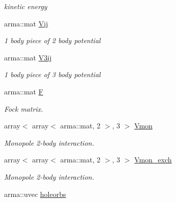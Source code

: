 \begin{DoxyCompactItemize}
\begin{DoxyCompactList}\small\item\em kinetic energy \end{DoxyCompactList}\item 
arma\+::mat \hyperlink{classHartreeFock_ae823da58505b21231d092b3ef7cec3bf}{Vij}\hypertarget{classHartreeFock_ae823da58505b21231d092b3ef7cec3bf}{}\label{classHartreeFock_ae823da58505b21231d092b3ef7cec3bf}

\begin{DoxyCompactList}\small\item\em 1 body piece of 2 body potential \end{DoxyCompactList}\item 
arma\+::mat \hyperlink{classHartreeFock_a25a0f38a655064375765f74182ce9334}{V3ij}\hypertarget{classHartreeFock_a25a0f38a655064375765f74182ce9334}{}\label{classHartreeFock_a25a0f38a655064375765f74182ce9334}

\begin{DoxyCompactList}\small\item\em 1 body piece of 3 body potential \end{DoxyCompactList}\item 
arma\+::mat \hyperlink{classHartreeFock_a45136295f4834a9f692f262eee75672a}{F}\hypertarget{classHartreeFock_a45136295f4834a9f692f262eee75672a}{}\label{classHartreeFock_a45136295f4834a9f692f262eee75672a}

\begin{DoxyCompactList}\small\item\em Fock matrix. \end{DoxyCompactList}\item 
array$<$ array$<$ arma\+::mat, 2 $>$, 3 $>$ \hyperlink{classHartreeFock_a2824bb161e6889684e0f54e5bc11e37e}{Vmon}\hypertarget{classHartreeFock_a2824bb161e6889684e0f54e5bc11e37e}{}\label{classHartreeFock_a2824bb161e6889684e0f54e5bc11e37e}

\begin{DoxyCompactList}\small\item\em Monopole 2-\/body interaction. \end{DoxyCompactList}\item 
array$<$ array$<$ arma\+::mat, 2 $>$, 3 $>$ \hyperlink{classHartreeFock_a3127c115a3acd7438fb06040be155736}{Vmon\+\_\+exch}\hypertarget{classHartreeFock_a3127c115a3acd7438fb06040be155736}{}\label{classHartreeFock_a3127c115a3acd7438fb06040be155736}

\begin{DoxyCompactList}\small\item\em Monopole 2-\/body interaction. \end{DoxyCompactList}\item 
arma\+::uvec \hyperlink{classHartreeFock_a9700861effb1cb3739240b76ed519141}{holeorbs}\hypertarget{classHartreeFock_a9700861effb1cb3739240b76ed519141}{}\label{classHartreeFock_a9700861effb1cb3739240b76ed519141}


\end{DoxyCompactItemize}

